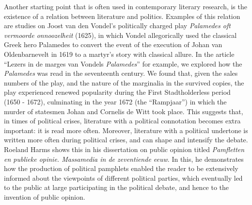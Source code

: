 Another starting point that is often used in contemporary literary research, is the existence of a relation between literature and politics. Examples of this relation are studies on Joost van den Vondel's politically charged play \textit{Palamedes oft vermoorde onnoozelheit} (1625), in which Vondel allegorically used the classical Greek hero Palamedes to convert the event of the execution of Johan van Oldenbarnevelt in 1619 to a martyr's story with classical allure. In the article \enquote{Lezers in de marges van Vondels \textit{Palamedes}} for example, we explored how the \textit{Palamedes} was read in the seventeenth century. We found that, given the sales numbers of the play, and the nature of the marginalia in the survived copies, the play experienced renewed popularity during the First Stadtholderless period (1650 - 1672), culminating in the year 1672 (the \enquote{Rampjaar}) in which the murder of statesmen Johan and Cornelis de Witt took place. \autocite[36, 50]{lassche_lezers_2019-2} This suggests that, in times of political crises, literature with a political connotation becomes extra important: it is read more often. Moreover, literature with a political undertone is written more often during political crises, and can shape and intensify the debate. Roeland Harms shows this in his dissertation on public opinion titled \textit{Pamfletten en publieke opinie. Massamedia in de zeventiende eeuw}. In this, he demonstrates how the production of political pamphlets enabled the reader to be extensively informed about the viewpoints of different political parties, which eventually led to the public at large participating in the political debate, and hence to the invention of public opinion.\autocite[256]{harms_pamfletten_2011}

